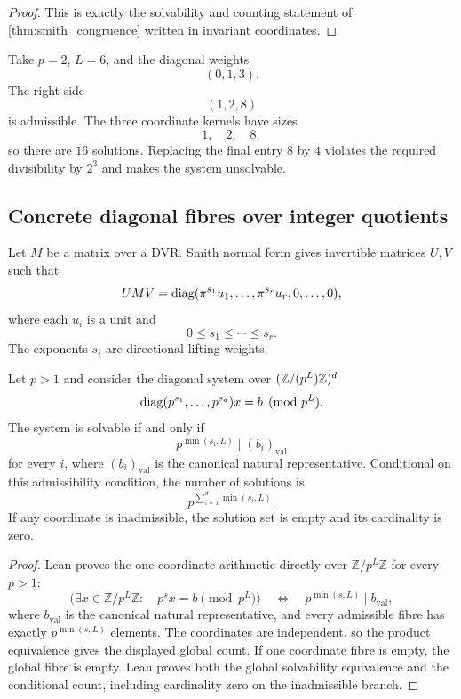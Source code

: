 \begin{proof}
This is exactly the solvability and counting statement of \cref{thm:smith_congruence} written in invariant coordinates.
\end{proof}

\begin{example}\label{ex:smith_three}
Take $p=2$, $L=6$, and the diagonal weights
\[
(0,1,3).
\]
The right side
\[
(1,2,8)
\]
is admissible.  The three coordinate kernels have sizes
\[
1,
\quad2,
\quad8,
\]
so there are $16$ solutions.  Replacing the final entry $8$ by $4$ violates the required divisibility by $2^3$ and makes the system unsolvable.
\end{example}

\subsection{Concrete diagonal fibres over integer quotients}

Let $M$ be a matrix over a DVR. Smith normal form gives invertible matrices $U,V$ such that
\[
UMV
=
\operatorname{diag}(\pi^{s_1}u_1,\ldots,\pi^{s_r}u_r,0,\ldots,0),
\]
where each $u_i$ is a unit and
\[
0\le s_1\le\cdots\le s_r.
\]
The exponents $s_i$ are directional lifting weights.

\begin{theorem}\label{thm:smith-solve}
Let $p>1$ and consider the diagonal system over
$(\mathbb Z/(p^L)\mathbb Z)^d$
\[
\operatorname{diag}(p^{s_1},\ldots,p^{s_d})x=b
\pmod{p^L}.
\]
The system is solvable if and only if
\[
p^{\min(s_i,L)}\mid (b_i)_{\mathrm{val}}
\]
for every $i$, where $(b_i)_{\mathrm{val}}$ is the canonical natural
representative. Conditional on this admissibility condition, the number of
solutions is
\[
\boxed{
p^{\sum_{i=1}^d\min(s_i,L)}.
}
\]
If any coordinate is inadmissible, the solution set is empty and its
cardinality is zero.
\end{theorem}

\begin{proof}
Lean proves the one-coordinate arithmetic directly over
$\mathbb Z/p^L\mathbb Z$ for every $p>1$:
\[
\bigl(\exists x\in\mathbb Z/p^L\mathbb Z:\quad p^s x=b\pmod{p^L}\bigr)
\quad\Longleftrightarrow\quad
p^{\min(s,L)}\mid b_{\mathrm{val}},
\]
where $b_{\mathrm{val}}$ is the canonical natural representative, and every
admissible fibre has exactly $p^{\min(s,L)}$ elements. The coordinates are
independent, so the product equivalence gives the displayed global count. If
one coordinate fibre is empty, the global fibre is empty. Lean proves both the
global solvability equivalence and the conditional count, including
cardinality zero on the inadmissible branch.
\end{proof}

